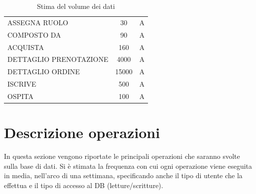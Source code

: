 \documentclass[a4paper,12pt]{report}
\begin{document}
\begin{table}[H]
\begin{tabularx}{\textwidth}{|X|c|c|}
		ASSEGNA RUOLO          & 30                      & A            \\
		COMPOSTO DA            & 90                      & A            \\
		ACQUISTA               & 160                     & A            \\
		DETTAGLIO PRENOTAZIONE & 4000                    & A            \\
		DETTAGLIO ORDINE       & 15000                   & A            \\
		ISCRIVE                & 500                     & A            \\
		OSPITA                 & 100                     & A            \\
		\hline
	\end{tabularx}
	\caption{Stima del volume dei dati}
\end{table}

\section{Descrizione operazioni}
In questa sezione vengono riportate le principali operazioni che saranno svolte sulla base di dati.
Si è stimata la frequenza con cui ogni operazione viene eseguita in media, nell'arco di una settimana,
specificando anche il tipo di utente che la effettua e il tipo di accesso al DB (letture/scritture).
\end{document}
